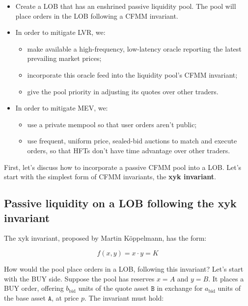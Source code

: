 \documentclass{article}
\begin{document}
\begin{itemize}
  \item Create a LOB that has an enshrined passive liquidity pool. The pool will place orders in the LOB following a CFMM invariant.
  \item In order to mitigate LVR, we:
        \begin{itemize}
          \item make available a high-frequency, low-latency oracle reporting the latest prevailing market prices;
          \item incorporate this oracle feed into the liquidity pool's CFMM invariant;
          \item give the pool priority in adjusting its quotes over other traders.
        \end{itemize}
  \item In order to mitigate MEV, we:
        \begin{itemize}
          \item use a private mempool so that user orders aren't public;
          \item use frequent, uniform price, sealed-bid auctions to match and execute orders, so that HFTs don't have time advantage over other traders.
        \end{itemize}
\end{itemize}

First, let's discuss how to incorporate a passive CFMM pool into a LOB. Let's start with the simplest form of CFMM invariants, the \textbf{xyk invariant}.

\subsection{Passive liquidity on a LOB following the xyk invariant}

The xyk invariant, proposed by Martin Köppelmann,\supercite{xykamm} has the form:

\begin{equation}
  f(x, y) = x \cdot y = K
\end{equation}

How would the pool place orders in a LOB, following this invariant? Let's start with the BUY side. Suppose the pool has reserves $x = A$ and $y = B$. It places a BUY order, offering $b_{\mathrm{bid}}$ units of the quote asset $\mathtt{B}$ in exchange for $a_{\mathrm{bid}}$ units of the base asset $\mathtt{A}$, at price $p$. The invariant must hold:
\end{document}

